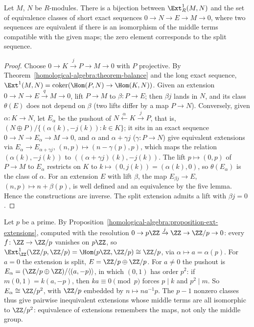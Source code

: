 \begin{proposition}\label{homological-algebra:proposition-ext-extensions}
Let $M$, $N$ be $R$-modules. There is a bijection between $\Ext^1_R(M, N)$ and the set of equivalence classes of short exact
sequences $0 \to N \to E \to M \to 0$, where two sequences are equivalent if there is an isomorphism of the middle terms compatible
with the given maps; the zero element corresponds to the split sequence.
\end{proposition}

\begin{proof}
Choose $0 \to K \xrightarrow{j} P \to M \to 0$ with $P$ projective. By Theorem~\ref{homological-algebra:theorem-balance} and the long
exact sequence, $\Ext^1(M, N) = \operatorname{coker}(\Hom(P, N) \to \Hom(K, N))$. Given an extension $0 \to N \to E \xrightarrow{q} M \to 0$, lift
$P \to M$ to $\beta \colon P \to E$; then $\beta j$ lands in $N$, and its class $\theta(E)$ does not depend on $\beta$ (two lifts differ by a
map $P \to N$). Conversely, given $\alpha \colon K \to N$, let $E_\alpha$ be the pushout of $N \xleftarrow{\alpha} K \xrightarrow{j} P$, that is,
$(N \oplus P)/\{(\alpha(k), -j(k)) : k \in K\}$; it sits in an exact sequence $0 \to N \to E_\alpha \to M \to 0$, and $\alpha$ and
$\alpha + \gamma j$ ($\gamma \colon P \to N$) give equivalent extensions via $E_\alpha \to E_{\alpha + \gamma j}$, $(n, p) \mapsto (n - \gamma(p), p)$, which maps
the relation $(\alpha(k), -j(k))$ to $((\alpha + \gamma j)(k), -j(k))$. The lift $p \mapsto (0, p)$ of $P \to M$ to $E_\alpha$ restricts on $K$ to
$k \mapsto (0, j(k)) = (\alpha(k), 0)$, so $\theta(E_\alpha)$ is the class of $\alpha$. For an extension $E$ with lift $\beta$, the map
$E_{\beta j} \to E$, $(n, p) \mapsto n + \beta(p)$, is well defined and an equivalence by the five lemma. Hence the constructions are
inverse. The split extension admits a lift with $\beta j = 0$.
\end{proof}

\begin{example}\label{homological-algebra:example-ext-zp}
Let $p$ be a prime. By Proposition~\ref{homological-algebra:proposition-ext-extensions}, computed with the resolution $0 \to p\ZZ \xrightarrow{j} \ZZ \to \ZZ/p \to 0$: every $f \colon \ZZ \to \ZZ/p$ vanishes on $p\ZZ$, so
$\Ext^1_\ZZ(\ZZ/p, \ZZ/p) = \Hom(p\ZZ, \ZZ/p) \cong \ZZ/p$, via $\alpha \mapsto a = \alpha(p)$. For $a = 0$ the extension is split, $E = \ZZ/p \oplus \ZZ/p$. For $a \neq 0$ the pushout is
$E_\alpha = (\ZZ/p \oplus \ZZ)/\langle(a, -p)\rangle$, in which $(0, 1)$ has order $p^2$: if $m(0, 1) = k(a, -p)$, then $ka \equiv 0 \pmod p$ forces $p \mid k$ and $p^2 \mid m$. So $E_\alpha \cong \ZZ/p^2$, with $\ZZ/p$
embedded by $n \mapsto na^{-1}p$. The $p - 1$ nonzero classes thus give pairwise inequivalent extensions whose middle terms are all isomorphic to $\ZZ/p^2$: equivalence of extensions remembers the maps, not
only the middle group.
\end{example}

